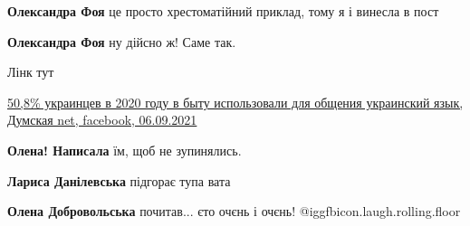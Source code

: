 \begin{itemize}
\begin{itemize}
\textbf{Олександра Фоя} це просто хрестоматійний приклад, тому я і винесла в пост

 
\textbf{Олександра Фоя} ну дійсно ж! Саме так.
\end{itemize}

 
Лінк тут

\href{https://www.facebook.com/205838236106547/posts/4827999290557062/}{%
50,8\% украинцев в 2020 году в быту использовали для общения украинский язык, %
Думская net, facebook, 06.09.2021%
}

\begin{itemize}
 
\textbf{Олена! Написала} їм, щоб не зупинялись.

 
\textbf{Лариса Данілевська} підгорає тупа вата

 
\textbf{Олена Добровольська} почитав... єто очєнь і очєнь! @igg{fbicon.laugh.rolling.floor} 
\end{itemize}

 

\end{itemize}

